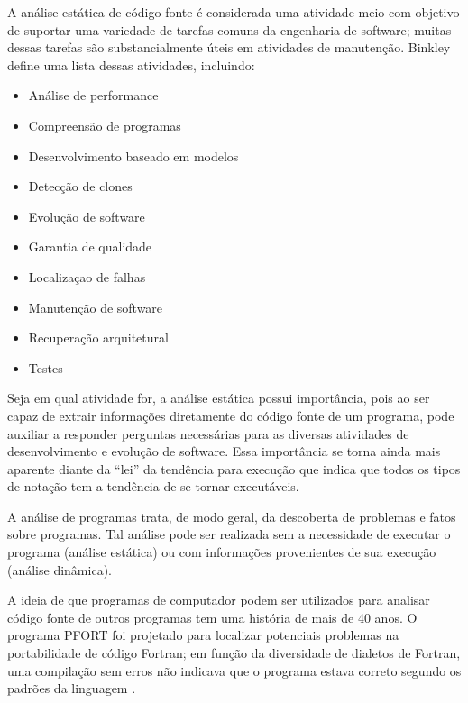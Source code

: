 A análise estática de código fonte é considerada uma atividade meio com
objetivo de suportar uma variedade de tarefas comuns da engenharia de
software; muitas dessas tarefas são substancialmente úteis em atividades de
manutenção. Binkley~ define uma lista dessas
atividades, incluindo:

\begin{multicols}{2}
  \begin{itemize}
    \item Análise de performance
    \item Compreensão de programas
    \item Desenvolvimento baseado em modelos
    \item Detecção de clones
    \item Evolução de software
    \item Garantia de qualidade
    \item Localizaçao de falhas
    \item Manutenção de software
    \item Recuperação arquitetural
    \item Testes
  \end{itemize}
\end{multicols}

Seja em qual atividade for, a análise estática possui importância,
pois ao ser capaz de extrair informações diretamente do
código fonte de um programa, pode auxiliar a responder perguntas necessárias
para as diversas atividades de desenvolvimento e evolução de software. Essa
importância se torna ainda mais aparente diante da ``lei'' da tendência para
execução \cite{Harman2010} que indica que todos os tipos de notação tem a
tendência de se tornar executáveis.


A análise de programas trata, de modo geral, da descoberta de problemas e
fatos sobre programas. Tal análise pode ser realizada sem a necessidade de executar o
programa (análise estática) ou com informações provenientes de sua execução
(análise dinâmica).

A ideia de que programas de computador podem ser utilizados para analisar
código fonte de outros programas tem uma história de mais de 40 anos.  O
programa PFORT \cite{Ryder1974} foi projetado para localizar potenciais
problemas na portabilidade de código Fortran; em função da diversidade de
dialetos de Fortran, uma compilação sem erros não indicava que o programa
estava correto segundo os padrões da linguagem \cite{Wichmann1995}.

